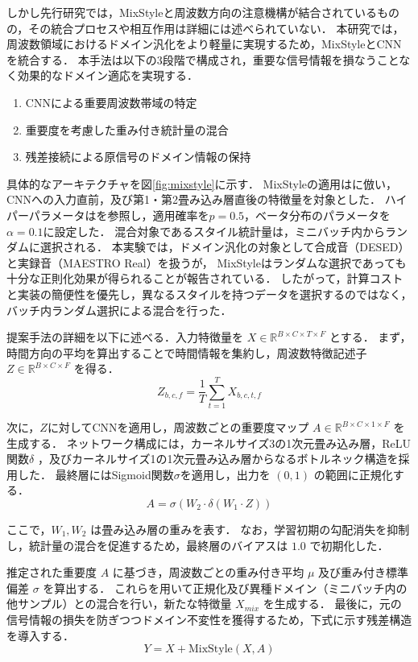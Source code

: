 \documentclass[main]{subfiles}
\begin{document}
しかし先行研究\cite{xiao2024fmsg}では，MixStyleと周波数方向の注意機構が結合されているものの，その統合プロセスや相互作用は詳細には述べられていない．
本研究では，周波数領域におけるドメイン汎化をより軽量に実現するため，MixStyleとCNNを統合する．
本手法は以下の3段階で構成され，重要な信号情報を損なうことなく効果的なドメイン適応を実現する． 
\begin{enumerate}
\item CNNによる重要周波数帯域の特定 
\item 重要度を考慮した重み付き統計量の混合 
\item 残差接続による原信号のドメイン情報の保持 
\end{enumerate}

具体的なアーキテクチャを図\ref{fig:mixstyle}に示す．
MixStyleの適用は\cite{xiao2024fmsg}に倣い，CNNへの入力直前，及び第1・第2畳み込み層直後の特徴量を対象とした．%
ハイパーパラメータは\cite{zhou2021domain}を参照し，適用確率を$p=0.5$，ベータ分布のパラメータを$\alpha=0.1$に設定した．
混合対象であるスタイル統計量は，ミニバッチ内からランダムに選択される．
本実験では，ドメイン汎化の対象として合成音（DESED）と実録音（MAESTRO Real）を扱うが，
MixStyleはランダムな選択であっても十分な正則化効果が得られることが報告されている\cite{zhou2021domain}．
したがって，計算コストと実装の簡便性を優先し，異なるスタイルを持つデータを選択するのではなく，バッチ内ランダム選択による混合を行った．\par

提案手法の詳細を以下に述べる．入力特徴量を $X \in \mathbb{R}^{B \times C \times T \times F}$ とする．
まず，時間方向の平均を算出することで時間情報を集約し，周波数特徴記述子 $Z \in \mathbb{R}^{B \times C \times F}$ を得る．
$$Z_{b,c,f} = \frac{1}{T} \sum_{t=1}^{T} X_{b,c,t,f}$$

次に，$Z$に対してCNNを適用し，周波数ごとの重要度マップ $A \in \mathbb{R}^{B \times C \times 1 \times F}$ を生成する．
ネットワーク構成には，カーネルサイズ3の1次元畳み込み層，ReLU関数$\delta$ ，及びカーネルサイズ1の1次元畳み込み層からなるボトルネック構造を採用した．
最終層にはSigmoid関数$\sigma$を適用し，出力を $(0, 1)$ の範囲に正規化する．
$$A = \sigma(W_2 \cdot \delta(W_1 \cdot Z))$$

ここで，$W_1, W_2$ は畳み込み層の重みを表す．
なお，学習初期の勾配消失を抑制し，統計量の混合を促進するため，最終層のバイアスは $1.0$ で初期化した．\par

推定された重要度 $A$ に基づき，周波数ごとの重み付き平均 $\mu$ 及び重み付き標準偏差 $\sigma$ を算出する．
これらを用いて正規化及び異種ドメイン（ミニバッチ内の他サンプル）との混合を行い，新たな特徴量 $X_{mix}$ を生成する．
最後に，元の信号情報の損失を防ぎつつドメイン不変性を獲得するため，下式に示す残差構造を導入する．
$$Y = X + \text{MixStyle}(X, A)$$
\end{document}
